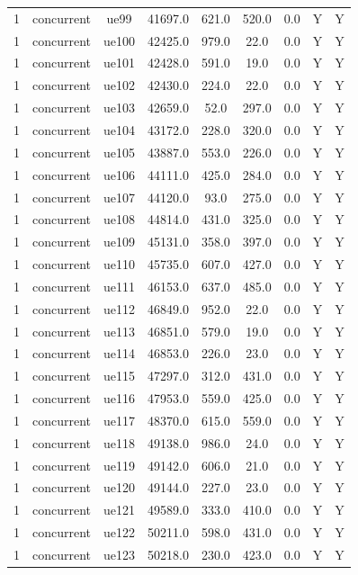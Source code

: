 \begin{table}[ht]
\begin{tabular}{|c|c|c|c|c|c|c|c|c|}
1 & concurrent & ue99 & 41697.0 & 621.0 & 520.0 & 0.0 & Y & Y \\
1 & concurrent & ue100 & 42425.0 & 979.0 & 22.0 & 0.0 & Y & Y \\
1 & concurrent & ue101 & 42428.0 & 591.0 & 19.0 & 0.0 & Y & Y \\
1 & concurrent & ue102 & 42430.0 & 224.0 & 22.0 & 0.0 & Y & Y \\
1 & concurrent & ue103 & 42659.0 & 52.0 & 297.0 & 0.0 & Y & Y \\
1 & concurrent & ue104 & 43172.0 & 228.0 & 320.0 & 0.0 & Y & Y \\
1 & concurrent & ue105 & 43887.0 & 553.0 & 226.0 & 0.0 & Y & Y \\
1 & concurrent & ue106 & 44111.0 & 425.0 & 284.0 & 0.0 & Y & Y \\
1 & concurrent & ue107 & 44120.0 & 93.0 & 275.0 & 0.0 & Y & Y \\
1 & concurrent & ue108 & 44814.0 & 431.0 & 325.0 & 0.0 & Y & Y \\
1 & concurrent & ue109 & 45131.0 & 358.0 & 397.0 & 0.0 & Y & Y \\
1 & concurrent & ue110 & 45735.0 & 607.0 & 427.0 & 0.0 & Y & Y \\
1 & concurrent & ue111 & 46153.0 & 637.0 & 485.0 & 0.0 & Y & Y \\
1 & concurrent & ue112 & 46849.0 & 952.0 & 22.0 & 0.0 & Y & Y \\
1 & concurrent & ue113 & 46851.0 & 579.0 & 19.0 & 0.0 & Y & Y \\
1 & concurrent & ue114 & 46853.0 & 226.0 & 23.0 & 0.0 & Y & Y \\
1 & concurrent & ue115 & 47297.0 & 312.0 & 431.0 & 0.0 & Y & Y \\
1 & concurrent & ue116 & 47953.0 & 559.0 & 425.0 & 0.0 & Y & Y \\
1 & concurrent & ue117 & 48370.0 & 615.0 & 559.0 & 0.0 & Y & Y \\
1 & concurrent & ue118 & 49138.0 & 986.0 & 24.0 & 0.0 & Y & Y \\
1 & concurrent & ue119 & 49142.0 & 606.0 & 21.0 & 0.0 & Y & Y \\
1 & concurrent & ue120 & 49144.0 & 227.0 & 23.0 & 0.0 & Y & Y \\
1 & concurrent & ue121 & 49589.0 & 333.0 & 410.0 & 0.0 & Y & Y \\
1 & concurrent & ue122 & 50211.0 & 598.0 & 431.0 & 0.0 & Y & Y \\
1 & concurrent & ue123 & 50218.0 & 230.0 & 423.0 & 0.0 & Y & Y \\

\end{tabular}
\end{table}
